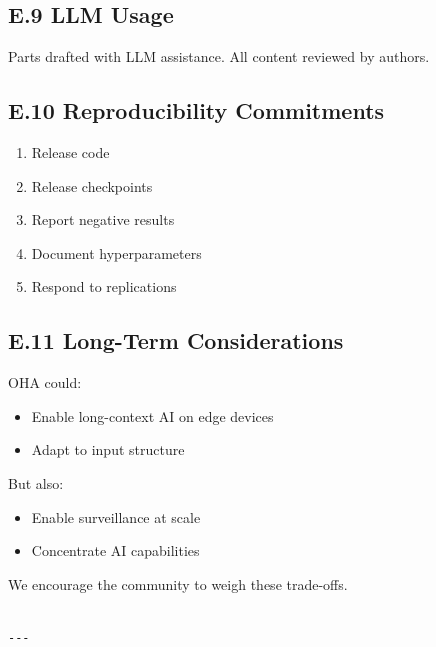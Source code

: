 \subsection{E.9 LLM Usage}

Parts drafted with LLM assistance. All content reviewed by authors.

\subsection{E.10 Reproducibility Commitments}

\begin{enumerate}
\item Release code
\item Release checkpoints
\item Report negative results
\item Document hyperparameters
\item Respond to replications

\end{enumerate}
\subsection{E.11 Long-Term Considerations}

OHA could:

\begin{itemize}
\item Enable long-context AI on edge devices
\item Adapt to input structure

\end{itemize}
But also:

\begin{itemize}
\item Enable surveillance at scale
\item Concentrate AI capabilities

\end{itemize}
We encourage the community to weigh these trade-offs.
\begin{lstlisting}

---
\end{lstlisting}